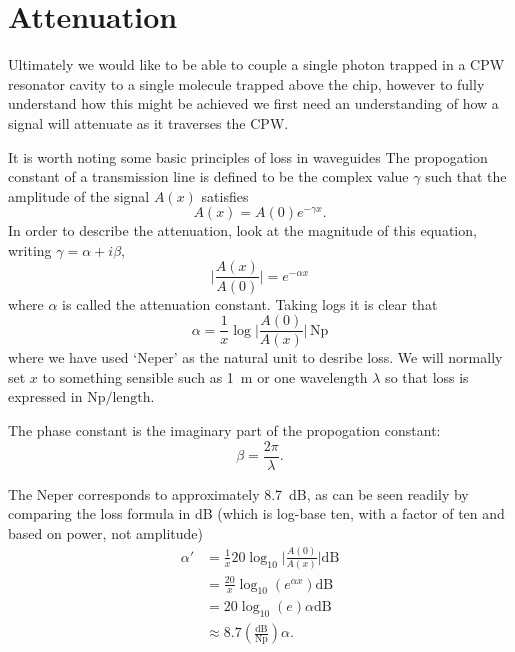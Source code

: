 \documentclass[a4paper]{article}
\begin{document}


\section{Attenuation}

Ultimately we would like to be able to couple a single photon trapped in a CPW
resonator cavity to a single molecule trapped above the chip, however to fully
understand how this might be achieved we first need an understanding of how a
signal will attenuate as it traverses the CPW.

It is worth noting some basic principles of loss in waveguides\cite{Collin2007}
The propogation constant of a transmission line is defined to be the complex
value $\gamma$ such that the amplitude of the signal $A(x)$ satisfies
\begin{equation}
  A(x) = A(0)e^{-\gamma x}.
\end{equation}
In order to describe the attenuation, look at the magnitude of this equation,
writing $\gamma = \alpha +i\beta$,
\begin{equation}
  \lvert\frac{A(x)}{A(0)}\rvert = e^{-\alpha x}
\end{equation}
where $\alpha$ is called the attenuation constant. Taking logs it is clear that
\begin{equation}
  \alpha = \frac{1}{x}\log\lvert\frac{A(0)}{A(x)}\rvert\,\si{\neper}
\end{equation}
where we have used `Neper' as the natural unit to desribe loss. We will normally
set $x$ to something sensible such as \SI{1}{\meter} or one wavelength $\lambda$
so that loss is expressed in $\si{\neper}/\mathrm{length}$.

The phase constant is the imaginary part of the propogation constant:
\begin{equation}
  \beta = \frac{2\pi}{\lambda}.
\end{equation}

The Neper corresponds to approximately \SI{8.7}{\dB}, as can be seen readily by
comparing the loss formula in dB (which is log-base ten, with a factor of ten
and based on power, not amplitude)
\begin{align*}
  \alpha' &= \frac{1}{x}20\log_{10}\lvert \frac{A(0)}{A(x)} \rvert \si{\dB}\\
          &= \frac{20}{x}\log_{10}(e^{\alpha x}) \si{\dB} \\
          &= 20 \log_{10}(e) \alpha \si{\dB} \\
          &\approx 8.7 \left(\frac{\si{\dB}}{\si{\neper}}\right) \alpha.
\end{align*}
\end{document}
